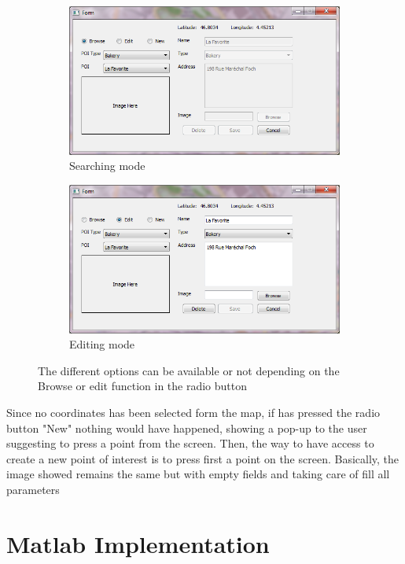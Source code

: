 \documentclass{article}
\begin{document}
\begin{figure}[h]
\centering
\begin{subfigure}{0.5\textwidth}
  \centering
  \includegraphics[width=.8\linewidth]{form.png}
  \caption{Searching mode}
  \label{fig:sub1}
\end{subfigure}%
\begin{subfigure}{0.5\textwidth}
  \centering
  \includegraphics[width=.8\linewidth]{form1.png}
  \caption{Editing mode}
  \label{fig:sub2}
\end{subfigure}
\caption{The different options can be available or not depending on the Browse or edit function in the radio button}
\label{fig:test}
\end{figure}

Since no coordinates has been selected form the map, if has pressed the radio button "New" nothing would have happened, showing a pop-up to the user suggesting to press a point from the screen. Then, the way to have access to create a new point of interest is to press first a point on the screen. Basically, the image showed remains the same but with empty fields and taking care of fill all parameters

\clearpage
\section{Matlab Implementation}
       
\end{document}
